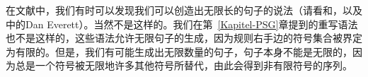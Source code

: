 
在文献中，我们有时可以发现我们可以创造出无限长的句子的说法（请看和，以及中的Dan Everett）。当然不是这样的。我们在第~\ref{Kapitel-PSG}章提到的重写语法也不是这样的，这些语法允许无限句子的生成，因为规则右手边的符号集合被界定为有限的。但是，我们有可能生成出无限数量的句子，句子本身不能是无限的，因为总是一个符号被无限地许多其他符号所替代，由此会得到非有限符号的序列。

